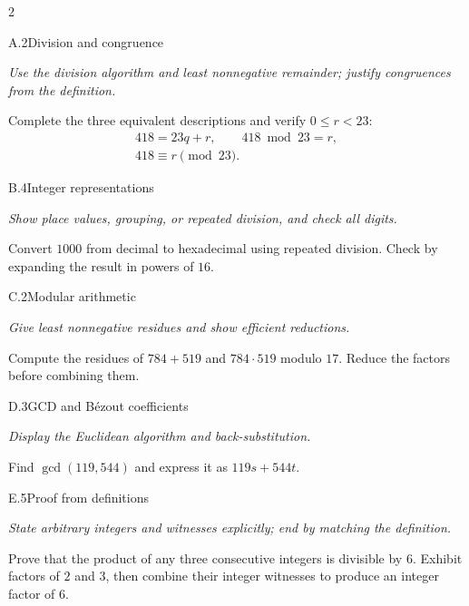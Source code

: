 \documentclass[9pt]{extarticle}
\begin{document}
\begin{multicols}{2}
\begin{CoreProblem}{A.2}{Division and congruence}
{\scriptsize\textit{Use the division algorithm and least nonnegative remainder; justify congruences from the definition.}\par}
Complete the three equivalent descriptions and verify $0\le r<23$:
\[
\begin{gathered}
418=23q+r,\qquad 418\bmod 23=r,\\
418\equiv r\pmod{23}.
\end{gathered}
\]
\end{CoreProblem}
\begin{CoreProblem}{B.4}{Integer representations}
{\scriptsize\textit{Show place values, grouping, or repeated division, and check all digits.}\par}
Convert $1000$ from decimal to hexadecimal using repeated division. Check by
expanding the result in powers of $16$.
\end{CoreProblem}
\begin{CoreProblem}{C.2}{Modular arithmetic}
{\scriptsize\textit{Give least nonnegative residues and show efficient reductions.}\par}
Compute the residues of $784+519$ and $784\cdot519$ modulo $17$. Reduce the
factors before combining them.
\end{CoreProblem}
\columnbreak
\begin{CoreProblem}{D.3}{GCD and B\'ezout coefficients}
{\scriptsize\textit{Display the Euclidean algorithm and back-substitution.}\par}
Find $\gcd(119,544)$ and express it as $119s+544t$.
\end{CoreProblem}
\begin{CoreProblem}{E.5}{Proof from definitions}
{\scriptsize\textit{State arbitrary integers and witnesses explicitly; end by matching the definition.}\par}
Prove that the product of any three consecutive integers is divisible by $6$.
Exhibit factors of $2$ and $3$, then combine their integer witnesses to
produce an integer factor of $6$.
\end{CoreProblem}
\end{multicols}
\CoreWorkArea
\FormBreak
{}
\end{document}
